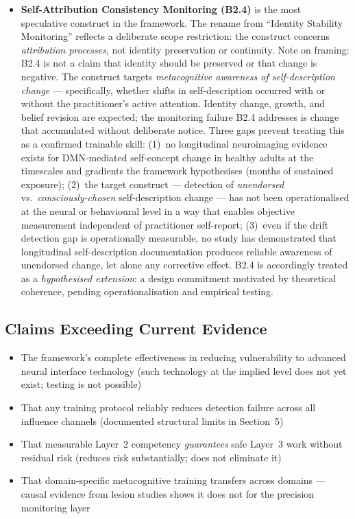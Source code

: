 \documentclass[12pt, a4paper]{article}
\begin{document}
\begin{itemize}[leftmargin=2em]
\item \textbf{Self-Attribution Consistency Monitoring (B2.4)} is the most speculative
construct in the framework. The rename from ``Identity Stability Monitoring''
reflects a deliberate scope restriction: the construct concerns \emph{attribution
processes}, not identity preservation or continuity. Note on framing: B2.4 is
not a claim that identity should be
preserved or that change is negative. The construct targets \emph{metacognitive
awareness of self-description change} --- specifically, whether shifts in
self-description occurred with or without the practitioner's active attention.
Identity change, growth, and belief revision are expected; the monitoring failure
B2.4 addresses is change that accumulated without deliberate notice. Three gaps
prevent treating this as a confirmed trainable skill: (1)~no longitudinal
neuroimaging evidence exists for DMN-mediated self-concept change in healthy
adults at the timescales and gradients the framework hypothesises (months of
sustained exposure); (2)~the target construct --- detection of \emph{unendorsed}
vs.\ \emph{consciously-chosen} self-description change --- has not been
operationalised at the neural or behavioural level in a way that enables
objective measurement independent of practitioner self-report; (3)~even if the
drift detection gap is operationally measurable, no study has demonstrated that
longitudinal self-description documentation produces reliable awareness of
unendorsed change, let alone any corrective effect. B2.4 is accordingly treated
as a \emph{hypothesised extension}: a design commitment motivated by theoretical
coherence, pending operationalisation and empirical testing.
\end{itemize}

\subsection{Claims Exceeding Current Evidence}

\begin{itemize}[leftmargin=2em]
\item The framework's complete effectiveness in reducing vulnerability to advanced neural interface technology (such technology at the implied level does not yet exist; testing is not possible)
\item That any training protocol reliably reduces detection failure across all influence channels (documented structural limits in Section~5)
\item That measurable Layer~2 competency \emph{guarantees} safe Layer~3 work without residual risk (reduces risk substantially; does not eliminate it)
\item That domain-specific metacognitive training transfers across domains --- causal evidence from lesion studies shows it does not for the precision monitoring layer \citep{fleming2014}
\end{itemize}
\end{document}
